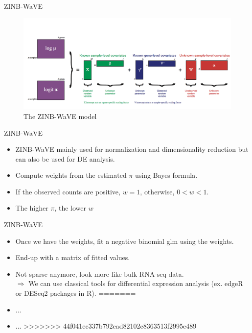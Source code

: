 \documentclass{beamer}
\begin{document}
\begin{frame}{ZINB-WaVE}
\begin{figure}
  \centering
      \includegraphics[height=0.5\textheight]{zinbwave}
      \caption{The ZINB-WaVE model}
\end{figure}
\end{frame}

\begin{frame}{ZINB-WaVE}

\begin{itemize}
<<<<<<< HEAD
  \itemsep10pt
  \item ZINB-WaVE mainly used for normalization and dimensionality reduction but can also be used for DE analysis.
  \item Compute weights from the estimated $\pi$ using Bayes formula.
  \item If the observed counts are positive, $w = 1$, otherwise, $0<w<1$.
  \item The higher $\pi$, the lower $w$
\end{itemize}

\end{frame}


\begin{frame}{ZINB-WaVE}

\begin{itemize}
  \itemsep10pt
  \item Once we have the weights, fit a negative binomial glm using the weights.
  \item End-up with a matrix of fitted values.
  \item Not sparse anymore, look more like bulk RNA-seq data.\\
  $\Longrightarrow$ We can use classical tools for differential expression analysis (ex. edgeR or DESeq2 packages in R).
=======
  \itemsep12pt
  \item ...
  \item ...
>>>>>>> 44f041ec337b792ead82102c8363513f2995e489
\end{itemize}

\end{frame}
\end{document}
